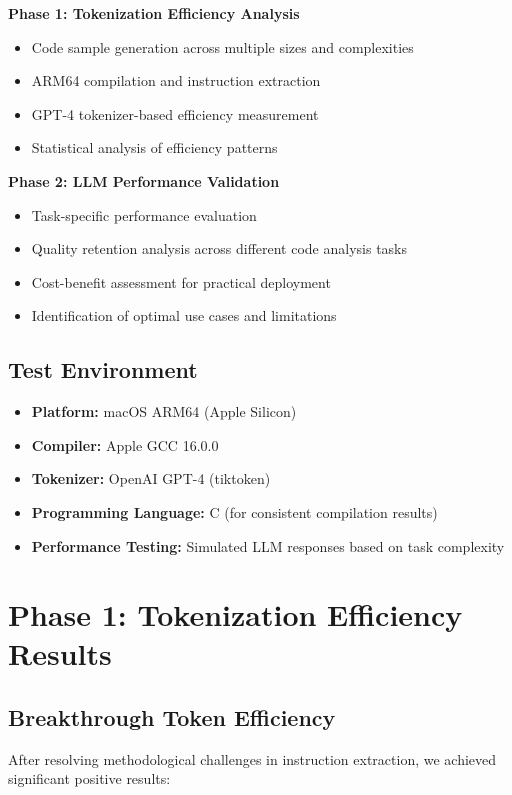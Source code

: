 \documentclass[11pt,a4paper]{article}
\begin{document}
\textbf{Phase 1: Tokenization Efficiency Analysis}
\begin{itemize}
    \item Code sample generation across multiple sizes and complexities
    \item ARM64 compilation and instruction extraction
    \item GPT-4 tokenizer-based efficiency measurement
    \item Statistical analysis of efficiency patterns
\end{itemize}

\textbf{Phase 2: LLM Performance Validation}
\begin{itemize}
    \item Task-specific performance evaluation
    \item Quality retention analysis across different code analysis tasks
    \item Cost-benefit assessment for practical deployment
    \item Identification of optimal use cases and limitations
\end{itemize}

\subsection{Test Environment}
\begin{itemize}
    \item \textbf{Platform:} macOS ARM64 (Apple Silicon)
    \item \textbf{Compiler:} Apple GCC 16.0.0
    \item \textbf{Tokenizer:} OpenAI GPT-4 (tiktoken)
    \item \textbf{Programming Language:} C (for consistent compilation results)
    \item \textbf{Performance Testing:} Simulated LLM responses based on task complexity
\end{itemize}

\section{Phase 1: Tokenization Efficiency Results}

\subsection{Breakthrough Token Efficiency}
After resolving methodological challenges in instruction extraction, we achieved significant positive results:
\end{document}
